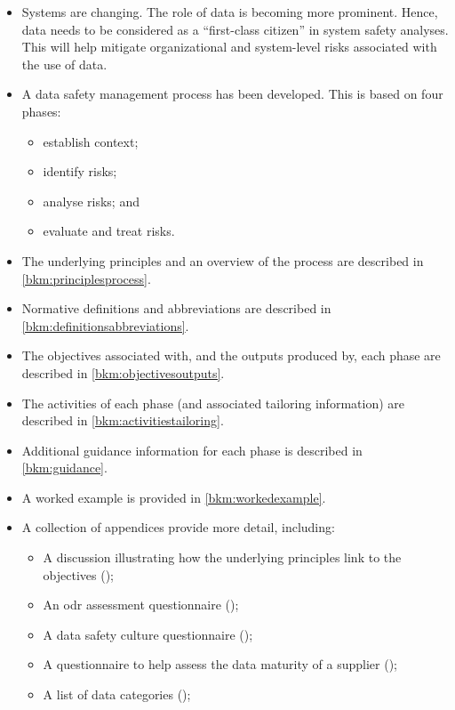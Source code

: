 \begin{itemize}
	\item Systems are changing. The role of data is becoming more prominent. Hence, data needs to be considered as a ``first-class citizen'' in system safety analyses. This will help mitigate organizational and system-level risks associated with the use of data.
	
	\item A data safety management process has been developed. This is based on four phases:
	\begin{itemize}
		\item establish context;
		\item identify risks;
		\item analyse risks; and
		\item evaluate and \gls{treat} risks.
	\end{itemize}
	\item The underlying principles and an overview of the process are described in \autoref{bkm:principlesprocess}.
	\item Normative definitions and abbreviations are described in \autoref{bkm:definitionsabbreviations}.
	\item The objectives associated with, and the outputs produced by, each phase are described in \autoref{bkm:objectivesoutputs}.
	\item The activities of each phase (and associated \gls{tailoring} \gls{information}) are described in \autoref{bkm:activitiestailoring}.
	\item Additional guidance \gls{information} for each phase is described in \autoref{bkm:guidance}.
	\item A worked example is provided in \autoref{bkm:workedexample}.
	\item A collection of appendices provide more detail, including:
	\begin{itemize}
		\item A discussion illustrating how the underlying principles link to the objectives (); 
		\item An \gls{odr} assessment questionnaire ();
		\item A data safety culture questionnaire ();
		\item A questionnaire to help assess the data maturity of a supplier ();
		\item A list of data categories ();

\end{itemize}
\end{itemize}
